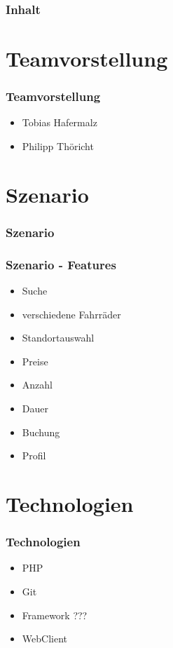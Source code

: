 \begin{frame}
	\frametitle*{Inhalt}
	\tableofcontents
\end{frame}

\section{Teamvorstellung}
\begin{frame}
	\frametitle*{Teamvorstellung}
	\begin{itemize}
		\item Tobias Hafermalz
		\item Philipp Thöricht
	\end{itemize}
\end{frame}

\section{Szenario}
\begin{frame}
	\frametitle*{Szenario}
\end{frame}

\begin{frame}
	\frametitle*{Szenario - Features}
	\begin{itemize}
		\item Suche
		\item verschiedene Fahrräder
		\item Standortauswahl
		\item Preise
		\item Anzahl
		\item Dauer
		\item Buchung
		\item Profil
	\end{itemize}
\end{frame}

\section{Technologien}
\begin{frame}
	\frametitle*{Technologien}
	\begin{itemize}
		\item PHP
		\item Git
		\item Framework ???
		\item WebClient
	\end{itemize}
\end{frame}

